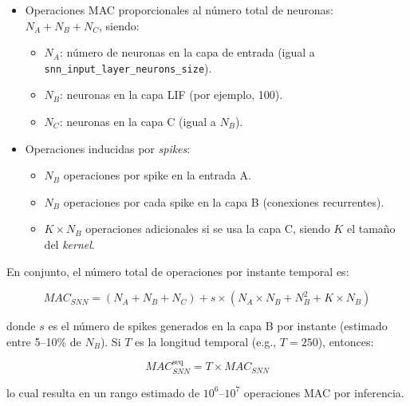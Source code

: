 \begin{itemize}
    \item Operaciones MAC proporcionales al número total de neuronas: $N_A + N_B + N_C$, siendo:
    \begin{itemize}
        \item $N_A$: número de neuronas en la capa de entrada (igual a \texttt{snn\_input\_layer\_neurons\_size}).
        \item $N_B$: neuronas en la capa LIF (por ejemplo, 100).
        \item $N_C$: neuronas en la capa C (igual a $N_B$).
    \end{itemize}
    
    \item Operaciones inducidas por \textit{spikes}:
    \begin{itemize}
        \item $N_B$ operaciones por spike en la entrada A.
        \item $N_B$ operaciones por cada spike en la capa B (conexiones recurrentes).
        \item $K \times N_B$ operaciones adicionales si se usa la capa C, siendo $K$ el tamaño del \textit{kernel}.
    \end{itemize}
\end{itemize}

En conjunto, el número total de operaciones por instante temporal es:

\begin{equation}
    MAC_{SNN} = (N_A + N_B + N_C) + s \times (N_A \times N_B + N_B^2 + K \times N_B)
\end{equation}

donde $s$ es el número de spikes generados en la capa B por instante (estimado entre 5--10\% de $N_B$). Si $T$ es la longitud temporal (e.g., $T = 250$), entonces:

\begin{equation}
    MAC^{\text{seq}}_{SNN} = T \times MAC_{SNN}
\end{equation}

lo cual resulta en un rango estimado de $10^6$--$10^7$ operaciones MAC por inferencia.